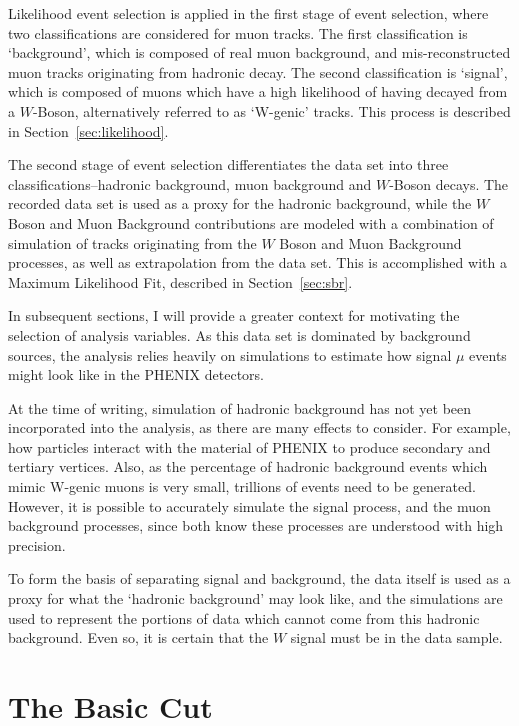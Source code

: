Likelihood event selection is applied in the first stage of event selection,
where two classifications are considered for muon tracks. The first
classification is `background', which is composed of real muon background, and
mis-reconstructed muon tracks originating from hadronic decay. The second
classification is `signal', which is composed of muons which have a high
likelihood of having decayed from a $W$-Boson, alternatively referred to as
`W-genic' tracks. This process is described in Section~\ref{sec:likelihood}.

The second stage of event selection differentiates the data set into three
classifications--hadronic background, muon background and $W$-Boson decays.
The recorded data set is used as a proxy for the hadronic background, while the
$W$ Boson and Muon Background contributions are modeled with a combination of
simulation of tracks originating from the $W$ Boson and Muon Background
processes, as well as extrapolation from the data set. This is accomplished with
a Maximum Likelihood Fit, described in Section~\ref{sec:sbr}.

In subsequent sections, I will provide a greater context for motivating the
selection of analysis variables. As this data set is dominated by background
sources, the analysis relies heavily on simulations to estimate how signal $\mu$
events might look like in the PHENIX detectors.

At the time of writing, simulation of hadronic background has not yet been
incorporated into the analysis, as there are many effects to consider. For
example, how particles interact with the material of PHENIX to produce secondary
and tertiary vertices. Also, as the percentage of hadronic background events
which mimic W-genic muons is very small, trillions of events need to be
generated. However, it is possible to accurately simulate the signal process,
and the muon background processes, since both know these processes are
understood with high precision.

To form the basis of separating signal and background, the data itself is used
as a proxy for what the `hadronic background' may look like, and the simulations
are used to represent the portions of data which cannot come from this hadronic
background. Even so, it is certain that the $W$ signal must be in the data
sample.

\clearpage
\section{The Basic Cut}
\label{sec:basic_cut}

